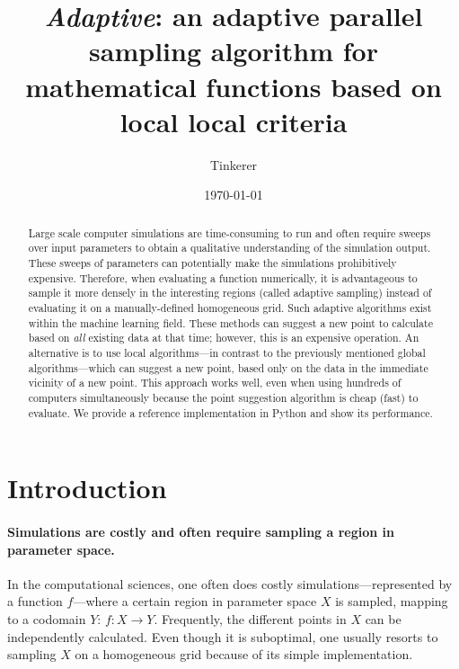 \documentclass[english, twocolumn, 10pt, aps, superscriptaddress, floatfix, prb, citeautoscript]{revtex4-1}
\begin{document}
\title{\emph{Adaptive}: an adaptive parallel sampling algorithm for mathematical functions based on local local criteria}

\author{Tinkerer}

\date{\today}

\begin{abstract}
Large scale computer simulations are time-consuming to run and often require sweeps over input parameters to obtain a qualitative understanding of the simulation output.
These sweeps of parameters can potentially make the simulations prohibitively expensive.
Therefore, when evaluating a function numerically, it is advantageous to sample it more densely in the interesting regions (called adaptive sampling) instead of evaluating it on a manually-defined homogeneous grid.
Such adaptive algorithms exist within the machine learning field.
These methods can suggest a new point to calculate based on \emph{all} existing data at that time; however, this is an expensive operation.
An alternative is to use local algorithms---in contrast to the previously mentioned global algorithms---which can suggest a new point, based only on the data in the immediate vicinity of a new point.
This approach works well, even when using hundreds of computers simultaneously because the point suggestion algorithm is cheap (fast) to evaluate.
We provide a reference implementation in Python and show its performance.
\end{abstract}

\flushbottom
\maketitle

\section{Introduction}

\paragraph{Simulations are costly and often require sampling a region in parameter space.}

In the computational sciences, one often does costly simulations---represented by a function \(f\)---where a certain region in parameter space \(X\) is sampled, mapping to a codomain \(Y\): \(f \colon X \to Y\).
Frequently, the different points in \(X\) can be independently calculated.
Even though it is suboptimal, one usually resorts to sampling \(X\) on a homogeneous grid because of its simple implementation.
\end{document}
